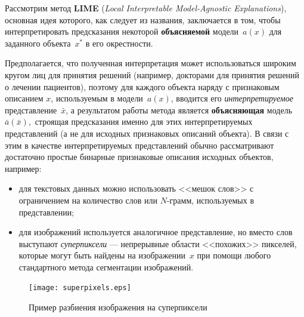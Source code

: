 \documentclass[12pt,a4paper]{article}
\begin{document}
	\par Рассмотрим метод \textbf{LIME} (\emph{Local Interpretable Model-Agnostic Explanations}), основная идея которого, как следует из названия, заключается в том, чтобы интерпретировать предсказания некоторой \textbf{объясняемой} модели~$a(x)$ для заданного объекта~$x^*$ в его окрестности.
	\par Предполагается, что полученная интерпретация может использоваться широким кругом лиц для принятия решений (например, докторами для принятия решений о лечении пациентов), поэтому для каждого объекта наряду с признаковым описанием $x$, используемым в модели~$a(x)$, вводится его \emph{интерпретируемое} представление~$\bar{x}$, а результатом работы метода является \textbf{объясняющая} модель~$\bar{a}(\bar{x}),$ строящая предсказания именно для этих интерпретируемых представлений (а не для исходных признаковых описаний объекта). В связи с этим в качестве интерпретируемых представлений обычно рассматривают достаточно простые бинарные признаковые описания исходных объектов, например:
	\begin{itemize}
		\item для текстовых данных можно использовать <<мешок слов>> с ограничением на количество слов или $N$-грамм, используемых в представлении;
		\item для изображений используется аналогичное представление, но вместо слов выступают \emph{суперпиксели} — непрерывные области <<похожих>> пикселей, которые могут быть найдены на изображении~$x$ при помощи любого стандартного метода сегментации изображений.
	\end{itemize}

	\begin{center}
	\begin{figure}[!htb]
		\centering
		\texttt{[image: superpixels.eps]}
		\caption{Пример разбиения изображения на суперпиксели}
	\end{figure}
\end{center}
\end{document}
